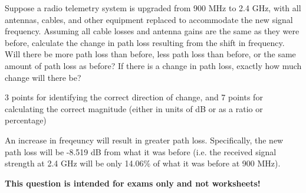 

Suppose a radio telemetry system is upgraded from 900 MHz to 2.4 GHz, with all antennas, cables, and other equipment replaced to accommodate the new signal frequency.  Assuming all cable losses and antenna gains are the same as they were before, calculate the change in path loss resulting from the shift in frequency.  Will there be more path loss than before, less path loss than before, or the same amount of path loss as before?  If there is a change in path loss, exactly how much change will there be?







3 points for identifying the correct direction of change, and 7 points for calculating the correct magnitude (either in units of dB or as a ratio or percentage)

\vskip 10pt

An increase in freqeuncy will result in greater path loss.  Specifically, the new path loss will be -8.519 dB from what it was before (i.e. the received signal strength at 2.4 GHz will be only 14.06\% of what it was before at 900 MHz).







{\bf This question is intended for exams only and not worksheets!}



